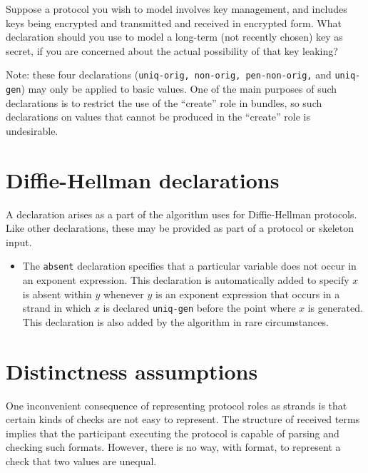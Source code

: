 \begin{exercise}
Suppose a protocol you wish to model involves key management, and
includes keys being encrypted and transmitted and received in
encrypted form.  What declaration should you use to model a long-term
(not recently chosen) key as secret, if you are concerned about the
actual possibility of that key leaking?
\end{exercise}

Note: these four declarations (\texttt{uniq-orig, non-orig,
  pen-non-orig,} and \texttt{uniq-gen}) may only be applied to basic
values.  One of the main purposes of such declarations is to restrict
the use of the ``create'' role in bundles, so such declarations on
values that cannot be produced in the ``create'' role is undesirable.

\section{Diffie-Hellman declarations}
A declaration arises as a part of the algorithm {\cpsa} uses for
Diffie-Hellman protocols.  Like other declarations, these may be
provided as part of a protocol or skeleton input.

\begin{itemize}

  \item {} The \texttt{absent} declaration specifies
    that a particular  variable does not occur in an %
    exponent expression.  This declaration is automatically added to
    specify $x$ is absent within $y$ whenever $y$ is an %
    exponent expression that occurs in a strand in which $x$ is
    declared \texttt{uniq-gen} before the point where $x$ is
    generated.  This declaration is also added by the algorithm in
    rare circumstances.
\end{itemize}

\iffalse

\section{Distinctness assumptions}
\label{sec:distinct_decls}

One inconvenient consequence of representing protocol roles as strands
is that certain kinds of checks are not easy to represent.  The
structure of received terms implies that the participant executing the
protocol is capable of parsing and checking such formats.  However,
there is no way, with format, to represent a check that two values are
unequal.

